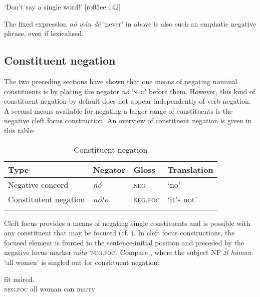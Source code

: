\glt ‘Don’t say a single word!’ [ro05ee 142]
\z

The fixed expression \textit{nó wán dé} ‘never’ in  above is also such an emphatic negative phrase, even if lexicalised. 

\subsection{Constituent negation}\label{sec:7.2.4}

The two preceding sections have shown that one means of negating nominal constituents is by placing the negator \textit{nó} ‘\textsc{neg}’ before them. However, this kind of constituent negation by default does not appear independently of verb negation. A second means available for negating a larger range of constituents is the negative cleft focus construction. An overview of constituent negation is given in this table: 

\begin{table}
\caption{Constituent negation}
\label{tab:key:7.3}

\begin{tabularx}{\textwidth}{lXXX}
\lsptoprule
Type & Negator & Gloss & Translation\\
\midrule 
Negative concord & \itshape nó & \textsc{neg} & ‘no’\\
Constitutent negation & \itshape nóto & \textsc{neg}.\textsc{foc} & ‘it’s not’\\
\lspbottomrule
\end{tabularx}
\end{table}
Cleft focus provides a means of negating single constituents and is possible with any constituent that may be focused (cf. ). In cleft focus constructions, the focused element is fronted to the sentence-initial position and preceded by the negative focus marker \textit{nóto} ‘\textsc{neg}.\textsc{foc}’. Compare , where the subject \textsc{NP} \textit{ɔ́l húman} ‘all women’ is singled out for constituent negation:


\ea%
    \label{ex:key:576}
    \gll {}      fít  máred.\\
\textsc{neg}.\textsc{foc}  all  woman  can  marry\\

